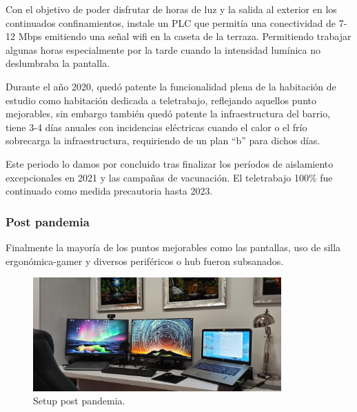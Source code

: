 Con el objetivo de poder disfrutar de horas de luz y la salida al exterior en los continuados confinamientos, instale un PLC\cite{c_plc_tech} que permitía una conectividad de 7-12 Mbps emitiendo una señal wifi en la caseta de la terraza. Permitiendo trabajar algunas horas especialmente por la tarde cuando la intensidad lumínica no deslumbraba la pantalla.

Durante el año 2020, quedó patente la funcionalidad plena de la habitación de estudio como habitación dedicada a teletrabajo, reflejando aquellos punto mejorables, sin embargo también quedó patente la infraestructura del barrio, tiene 3-4 días anuales con incidencias eléctricas cuando el calor o el frío sobrecarga la infraestructura, requiriendo de un plan “b” para dichos días.

Este periodo lo damos por concluido tras finalizar los períodos de aislamiento excepcionales en 2021 y las campañas de vacunación. El teletrabajo 100\% fue continuado como medida precautoria hasta 2023.

\subsubsection{Post pandemia}
Finalmente la mayoría de los puntos mejorables como las pantallas, uso de silla ergonómica-gamer y diversos periféricos o hub fueron subsanados.

\begin{figure}[!htb]
\begin{center}
\includegraphics[width=0.85\textwidth]{./figuras/setup_dos.jpg}
\caption{Setup post pandemia.}
\label{F:setup_dos}
\end{center}
\end{figure}

